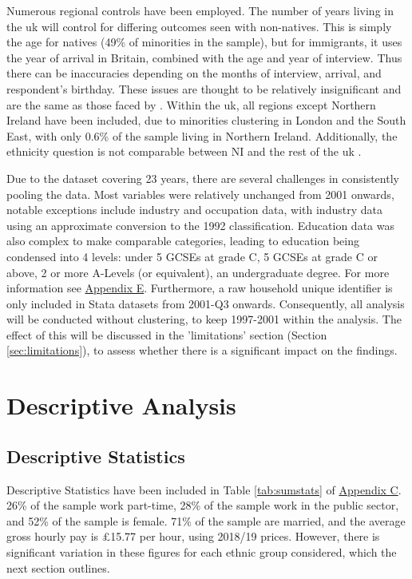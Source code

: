 \documentclass[class=article, crop=false]{standalone}
\begin{document}
Numerous regional controls have been employed. The number of years living in the \acrshort{uk} will control for differing outcomes seen with non-natives. This is simply the age for natives (49\% of minorities in the sample), but for immigrants, it uses the year of arrival in Britain, combined with the age and year of interview. Thus there can be inaccuracies depending on the months of interview, arrival, and respondent’s birthday. These issues are thought to be relatively insignificant and are the same as those faced by \citet{Berthoud}. Within the \acrshort{uk}, all regions except Northern Ireland have been included, due to minorities clustering in London and the South East, with only 0.6\% of the sample living in Northern Ireland. Additionally, the ethnicity question is not comparable between NI and the rest of the \acrshort{uk} \citep{Longhi}.

Due to the dataset covering 23 years, there are several challenges in consistently pooling the data. Most variables were relatively unchanged from 2001 onwards, notable exceptions include industry and occupation data, with industry data using an approximate conversion to the 1992 classification. Education data was also complex to make comparable categories, leading to education being condensed into 4 levels: under 5 GCSEs at grade C, 5 GCSEs at grade C or above, 2 or more A-Levels (or equivalent), an undergraduate degree. For more information see \hyperref[sec:appendixE]{Appendix E}. Furthermore, a raw household unique identifier is only included in Stata datasets from 2001-Q3 onwards. Consequently, all analysis will be conducted without clustering, to keep 1997-2001 within the analysis. The effect of this will be discussed in the 'limitations' section (Section \ref{sec:limitations}), to assess whether there is a significant impact on the findings.


\section{Descriptive Analysis}
\label{sec:Descriptive Analysis}
\subsection{Descriptive Statistics}
\label{sec:Descriptive Statistics}
Descriptive Statistics have been included in Table \ref{tab:sumstats} of \hyperref[sec:appendixC]{Appendix C}. 26\% of the sample work part-time, 28\% of the sample work in the public sector, and 52\% of the sample is female. 71\% of the sample are married, and the average gross hourly pay is £15.77 per hour, using 2018/19 prices. However, there is significant variation in these figures for each ethnic group considered, which the next section outlines.
\end{document}
